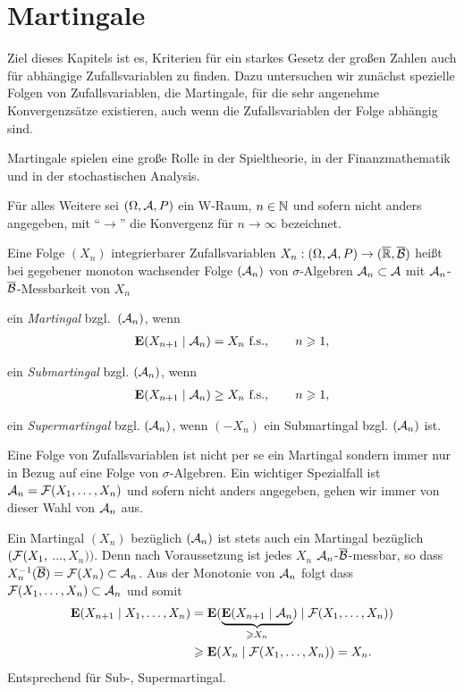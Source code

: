 \chapter{Martingale}

Ziel dieses Kapitels ist
es, Kriterien für ein starkes Gesetz der großen Zahlen auch für abhängige
Zufallsvariablen zu finden. Dazu untersuchen wir zunächst spezielle Folgen von
Zufallsvariablen, die Martingale, für die sehr angenehme
Konvergenzsätze existieren, auch wenn die Zufallsvariablen der Folge abhängig
sind.

Martingale spielen eine große Rolle in der Spieltheorie, in der
Finanzmathematik und in der stochastischen Analysis.

Für alles Weitere sei $(\Omega,\AA,P)$ ein W-Raum, $n\in\N$ und sofern nicht
anders angegeben, mit ``$\to$'' die Konvergenz für $n\to\infty$
bezeichnet.

\begin{defn}
\label{defn:11.1}
Eine Folge $(X_{n})$ integrierbarer Zufallsvariablen $X_{n}: (\Omega ,
{\AA},P)\to (\RA, \overline{\BB})$ heißt bei gegebener monoton
wachsender Folge $({\AA}_{n})$ von $\sigma $-Algebren ${\AA}_{n}\subset {\AA}$
mit ${\AA}_{n}$-$\overline{\BB}$-Messbarkeit von $X_{n}$
\begin{propenum}
\item
ein \emph{Martingal} bzgl.\ $({\AA}_{n})$, wenn
\begin{align*}
\E(X_{n+1}\mid {\AA}_{n}) 
= X_{n}\fs,\qquad n\ge 1,
\end{align*}
\item
ein \emph{Submartingal} bzgl. $({\AA}_{n})$, wenn
\begin{align*}
\E(X_{n+1}\mid {\AA}_{n})\geq X_{n} \fs,\qquad n\ge 1,
\end{align*}
\item
ein \emph{Supermartingal}  bzgl. $({\AA}_{n})$, wenn
$(-X_{n})$ ein Submartingal bzgl. $({\AA}_{n})$ ist.~\fishhere
\end{propenum}
\end{defn}

Eine Folge von Zufallsvariablen ist nicht per se ein Martingal sondern
immer nur in Bezug auf eine Folge von $\sigma$-Algebren. Ein wichtiger
Spezialfall ist ${\AA}_{n}= {\FF}(X_{1},\ldots ,X_{n})$ und sofern nicht anders
angegeben, gehen wir immer von dieser Wahl von $\AA_n$ aus.

\begin{bem}
\label{bem:11.1}
Ein Martingal $(X_{n})$ bezüglich $({\AA}_{n})$ ist stets auch
ein Martingal bezüglich $({\FF} (X_{1},$ $\ldots, X_{n}))$. Denn nach
Voraussetzung ist jedes $X_n$ $\AA_n$-$\overline{\BB}$-messbar, so dass
$X_n^{-1}(\overline{\BB}) = \FF(X_n) \subset \AA_n$. Aus der Monotonie von
$\AA_n$ folgt dass $\FF(X_1,\ldots,X_n)\subset\AA_n$ und somit
\begin{align*}
\E(X_{n+1}\mid X_1,\ldots,X_n) &= 
\E(\underbrace{\E(X_{n+1}\mid \AA_n}_{\ge X_n})\mid \FF(X_1,\ldots,X_n))\\
&\ge \E(X_n\mid \FF(X_1,\ldots,X_n)) = X_n. 
\end{align*}
Entsprechend für Sub-, Supermartingal.\maphere
\end{bem}

